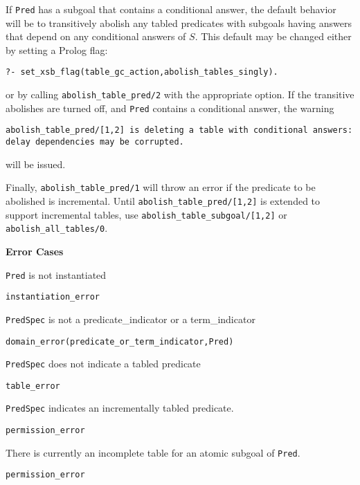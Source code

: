 \begin{description}
\begin{description}
If {\tt Pred} has a subgoal that contains a conditional answer, the
default behavior will be to transitively abolish any tabled predicates
with subgoals having answers that depend on any conditional answers of
$S$.  This default may be changed either by setting a Prolog flag:
%
\begin{verbatim}
?- set_xsb_flag(table_gc_action,abolish_tables_singly).
\end{verbatim}
% 
or by calling {\tt abolish\_table\_pred/2} with the appropriate
option.  If the transitive abolishes are turned off, and {\tt Pred}
contains a conditional answer, the warning

{\tt abolish\_table\_pred/[1,2] is deleting a table with
  conditional\ answers: \\ delay dependencies may be corrupted.}

will be issued.  


Finally, {\tt abolish\_table\_pred/1} will throw an error if the
predicate to be abolished is incremental.  
%
%
Until {\tt abolish\_table\_pred/[1,2]} is extended to support
incremental tables, use {\tt abolish\_table\_subgoal/[1,2]} or {\tt
  abolish\_all\_tables/0}.

{\bf Error Cases}
\bi
%
\item {\tt Pred} is not instantiated
 \bi 
 \item 	{\tt instantiation\_error}
 \ei
%
\item {\tt PredSpec} is not a predicate\_indicator or a term\_indicator
 \bi
 \item 	{\tt domain\_error(predicate\_or\_term\_indicator,Pred)}
 \ei
%
\item {\tt PredSpec} does not indicate a tabled predicate
  \bi
 \item 	{\tt table\_error}
 \ei
%
\item {\tt PredSpec} indicates an incrementally tabled predicate.  
\bi
 \item 	{\tt permission\_error}
 \ei
\item There is currently an incomplete table for an atomic subgoal of
  {\tt Pred}.
\bi
 \item 	{\tt permission\_error}
 \ei
%
\ei


\end{description}
\end{description}
